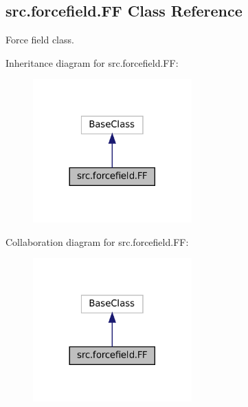 \hypertarget{classsrc_1_1forcefield_1_1FF}{}\subsection{src.\+forcefield.\+FF Class Reference}
\label{classsrc_1_1forcefield_1_1FF}


Force field class.  




Inheritance diagram for src.\+forcefield.\+FF\+:
\nopagebreak
\begin{figure}[H]
\begin{center}
\leavevmode
\includegraphics[width=173pt]{classsrc_1_1forcefield_1_1FF__inherit__graph}
\end{center}
\end{figure}


Collaboration diagram for src.\+forcefield.\+FF\+:
\nopagebreak
\begin{figure}[H]
\begin{center}
\leavevmode
\includegraphics[width=173pt]{classsrc_1_1forcefield_1_1FF__coll__graph}
\end{center}
\end{figure}
